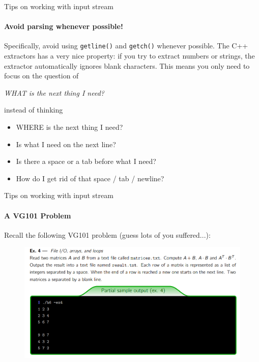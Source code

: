 \begin{frame}[fragile]{Tips on working with input stream}
\framesubtitle{Avoid parsing whenever possible!}
Specifically, avoid using \texttt{getline()} and \texttt{getch()} whenever possible. The C++ extractors has a very nice property: if you try to extract numbers or strings, the extractor automatically ignores blank characters. This means you only need to focus on the question of 
\begin{center}
	\textit{WHAT is the next thing I need?}
\end{center}

instead of thinking 
\begin{itemize}
	\item WHERE is the next thing I need?
	\item Is what I need on the next line?
	\item Is there a space or a tab before what I need?
	\item How do I get rid of that space / tab / newline?
\end{itemize}
\end{frame}

\begin{frame}[fragile]{Tips on working with input stream}
\framesubtitle{A VG101 Problem}
Recall the following VG101 problem (guess lots of you suffered...):
\begin{figure}
	\centering
	\includegraphics[scale=0.4]{fig/rc5_vg101}
\end{figure}
\end{frame}

